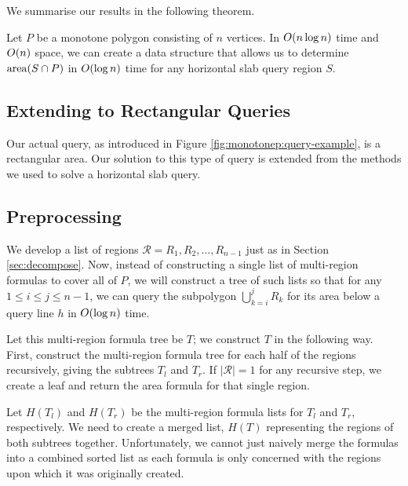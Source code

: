  
We summarise our results in the following theorem.

\begin{theorem}
\label{th:montonep:slab-area}
Let $P$ be a monotone polygon consisting of $n$ vertices. In $O\!\left(n \log{n}\right)$ 
time and $O\!\left(n\right)$ space, we can create a data structure that allows us to 
determine $\operatorname{area}\!\left(S \cap P\right)$ in $O\!\left(\log{n}\right)$ time for any horizontal slab 
query region $S$.
\end{theorem}



\subsection{Extending to Rectangular Queries}
\label{:monotonep:rect}

Our actual query, as introduced in Figure \ref{fig:monotonep:query-example}, is 
a rectangular area. Our solution to this type of query is extended from the 
methods we used to solve a horizontal slab query.

\subsection{Preprocessing}
\label{:monotonep:rect:pre}

We develop a list of regions $\mathcal{R} = R_1, R_2, \ldots, R_{n-1}$ just as 
in Section \ref{sec:decompose}.  Now, instead of constructing a single list of 
multi-region formulas to cover all of $P$, we will construct a tree of such 
lists so that for any $1 \leq i \leq j \leq n-1$, we can query the subpolygon 
$\bigcup_{k=i}^{j}{R_k}$ for its area below a query line $h$ in 
$O\!\left(\log{n}\right)$ time.

Let this multi-region formula tree be $T$; we construct $T$ in the following 
way. First, construct the multi-region formula tree for each half of the regions 
recursively, giving the subtrees $T_l$ and $T_r$. If $|\mathcal{R}| = 1$ for any 
recursive step, we create a leaf and return the area formula for that single 
region.

Let $H(T_l)$ and $H(T_r)$ be the multi-region formula lists for $T_l$ and $T_r$, 
respectively. 
We need to create a merged list, $H(T)$ representing the regions of both 
subtrees together. 
Unfortunately, we cannot just naively merge the formulas into a combined sorted 
list as each formula is only concerned with the regions upon which it was 
originally created. 

